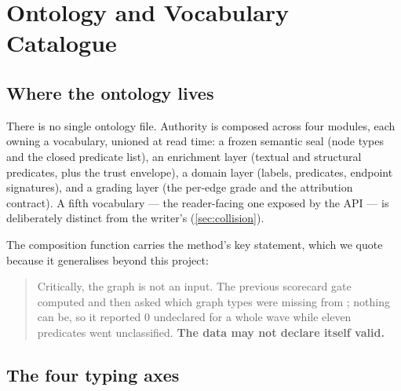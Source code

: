 \section{Ontology and Vocabulary Catalogue}
\label{sec:appendix-ontology}

\subsection{Where the ontology lives}

There is no single ontology file. Authority is composed across four modules, each
owning a vocabulary, unioned at read time: a frozen semantic seal (node types and
the closed predicate list), an enrichment layer (textual and structural predicates,
plus the trust envelope), a domain layer (labels, predicates, endpoint signatures),
and a grading layer (the per-edge grade and the attribution contract). A fifth
vocabulary --- the reader-facing one exposed by the \mbox{API} --- is deliberately
distinct from the writer's (\cref{sec:collision}).

The composition function carries the method's key statement, which we quote because
it generalises beyond this project:

\begin{quote}\small
Critically, the graph is not an input. The previous scorecard gate computed
 and then asked which graph types
were missing from ; nothing can be, so it reported 0 undeclared for a
whole wave while eleven predicates went unclassified. \textbf{The data may not
declare itself valid.}
\end{quote}

\subsection{The four typing axes}

